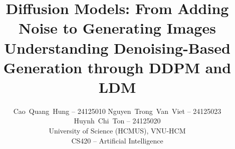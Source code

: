 \documentclass[10pt,twocolumn,letterpaper]{article}
\title{Diffusion Models: From Adding Noise to Generating Images\\
  \large Understanding Denoising-Based Generation through DDPM and LDM}
\author{\mbox{Cao Quang Hung} -- 24125010\quad
        \mbox{Nguyen Trong Van Viet} -- 24125023\\
        \mbox{Huynh Chi Ton} -- 24125020\\
        University of Science (HCMUS), VNU-HCM\\
        CS420 -- Artificial Intelligence}
\begin{document}
\maketitle

\FloatBarrier
\label{LastBodyPage}
\clearpage
{\small
\balance


}
\clearpage
\nobalance
\appendix

\end{document}
